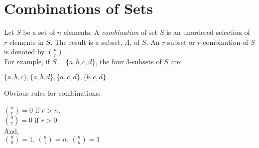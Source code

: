 \documentclass[12pt, letterpaper]{article}
\begin{document}
 
\maketitle

\section*{Combinations of Sets}

Let \(S\) be a set of \(n\) elements, A \textit{combination} of set \(S\) is an unordered selection 
of \(r\) elements in \(S\). The result is a subset, \(A\), of \(S\). An \(r\)-subset or \(r\)-combination
of \(S\) is denoted by \(\binom{n}{r}\). \\ 

\noindent For example, if \(S = \{a, b, c, d\}\), the four 3-subsets of \(S\) are: 

\begin{center}
  \(
    \{a, b, c\}, \{a, b, d\}, \{a, c, d\}, \{b, c, d\}
  \)
\end{center}

\noindent Obvious rules for combinations:

\begin{center}
  \( \binom{n}{r} = 0 \) if \(r > n\), \\
  \( \binom{0}{r} = 0 \) if \(r > 0\) \\
  And, \\
  \( \binom{n}{0} = 1,\, \binom{n}{1}=n,\, \binom{n}{n} = 1\)
\end{center}
\end{document}
